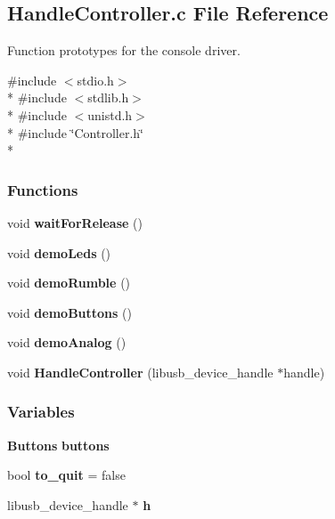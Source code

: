 \subsection{Handle\-Controller.\-c File Reference}
\label{_handle_controller_8c}


Function prototypes for the console driver.  


{\ttfamily \#include $<$stdio.\-h$>$}\\*
{\ttfamily \#include $<$stdlib.\-h$>$}\\*
{\ttfamily \#include $<$unistd.\-h$>$}\\*
{\ttfamily \#include \char`\"{}Controller.\-h\char`\"{}}\\*
\subsubsection*{Functions}
\begin{DoxyCompactItemize}
\item 
void {\bfseries wait\-For\-Release} ()\label{_handle_controller_8c_ab7fb4c3474336a5c402df4ae98bcacc2}

\item 
void {\bfseries demo\-Leds} ()\label{_handle_controller_8c_ac7948bca1869545b6c38851a45a1fd94}

\item 
void {\bfseries demo\-Rumble} ()\label{_handle_controller_8c_afe46e2a324f590070a498e43557eeaa5}

\item 
void {\bfseries demo\-Buttons} ()\label{_handle_controller_8c_a85d0f6216872d601bc29477aa771694e}

\item 
void {\bfseries demo\-Analog} ()\label{_handle_controller_8c_ae7662207a636c8a81fb18db7e79e371a}

\item 
void {\bfseries Handle\-Controller} (libusb\-\_\-device\-\_\-handle $\ast$handle)\label{_handle_controller_8c_ae75a18b65c6212d966c24396232cf2a6}

\end{DoxyCompactItemize}
\subsubsection*{Variables}
\begin{DoxyCompactItemize}
\item 
{\bf Buttons} {\bfseries buttons}\label{_handle_controller_8c_afa40ef3a984d5e0e7dfa2daa67a4be66}

\item 
bool {\bfseries to\-\_\-quit} = false\label{_handle_controller_8c_af41eab6e340787076c0bda3999c9bcd9}

\item 
libusb\-\_\-device\-\_\-handle $\ast$ {\bfseries h}\label{_handle_controller_8c_ab5a9828caa3c01799200f9094663bf99}

\end{DoxyCompactItemize}


